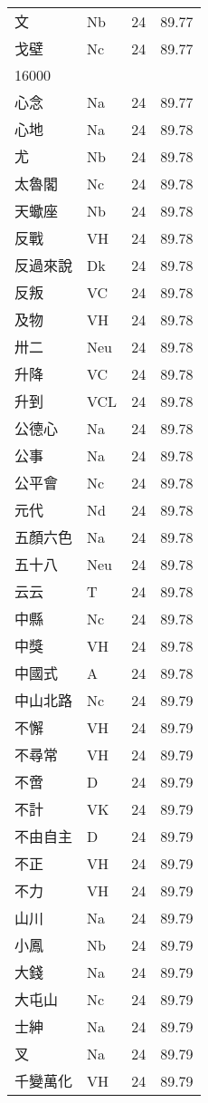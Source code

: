 \documentclass[twocolumn]{book}
\begin{document}
\begin{supertabular}{llrr}
文 & Nb & 24 &  89.77\\
戈壁 & Nc & 24 &  89.77\\
16000\\
心念 & Na & 24 &  89.77\\
心地 & Na & 24 &  89.78\\
尤 & Nb & 24 &  89.78\\
太魯閣 & Nc & 24 &  89.78\\
天蠍座 & Nb & 24 &  89.78\\
反戰 & VH & 24 &  89.78\\
反過來說 & Dk & 24 &  89.78\\
反叛 & VC & 24 &  89.78\\
及物 & VH & 24 &  89.78\\
卅二 & Neu & 24 &  89.78\\
升降 & VC & 24 &  89.78\\
升到 & VCL & 24 &  89.78\\
公德心 & Na & 24 &  89.78\\
公事 & Na & 24 &  89.78\\
公平會 & Nc & 24 &  89.78\\
元代 & Nd & 24 &  89.78\\
五顏六色 & Na & 24 &  89.78\\
五十八 & Neu & 24 &  89.78\\
云云 & T & 24 &  89.78\\
中縣 & Nc & 24 &  89.78\\
中獎 & VH & 24 &  89.78\\
中國式 & A & 24 &  89.78\\
中山北路 & Nc & 24 &  89.79\\
不懈 & VH & 24 &  89.79\\
不尋常 & VH & 24 &  89.79\\
不啻 & D & 24 &  89.79\\
不計 & VK & 24 &  89.79\\
不由自主 & D & 24 &  89.79\\
不正 & VH & 24 &  89.79\\
不力 & VH & 24 &  89.79\\
山川 & Na & 24 &  89.79\\
小鳳 & Nb & 24 &  89.79\\
大錢 & Na & 24 &  89.79\\
大屯山 & Nc & 24 &  89.79\\
士紳 & Na & 24 &  89.79\\
叉 & Na & 24 &  89.79\\
千變萬化 & VH & 24 &  89.79\\

\end{supertabular}
\end{document}
